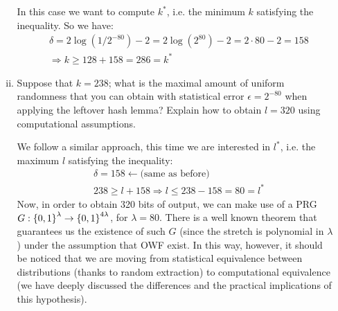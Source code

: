 \begin{enumerate}[(a)]
\begin{enumerate}[(i)]
\begin{solution}
			In this case we want to compute $k^*$, i.e. the minimum $k$ satisfying the inequality. So we have:
			\begin{align*}
				&\delta = 2 \log(1/2^{-80}) - 2 = 2 \log(2^{80}) - 2 = 2\cdot 80 - 2 = 158 \\
				&\Rightarrow k \ge 128 + 158 = 286 = k^*
			\end{align*}
		\end{solution}
		
		\item Suppose that $k = 238$; what is the maximal amount of uniform randomness that you can obtain with statistical error $\epsilon = 2^{-80}$ when applying the leftover hash lemma? Explain how to obtain $l = 320$ using computational assumptions.

		\begin{solution}
			We follow a similar approach, this time we are interested in $l^*$, i.e. the maximum $l$ satisfying the inequality:
			\begin{align*}
				&\delta = 158 \leftarrow \mbox{(same as before)} \\
				&238 \ge l + 158 \Rightarrow l \le 238 - 158 = 80 = l^*
			\end{align*}			
			Now, in order to obtain 320 bits of output, we can make use of a PRG $G: {\{0, 1\}}^{\lambda} \to {\{0, 1\}}^{4\lambda}$, for $\lambda = 80$.
			There is a well known theorem that guarantees us the existence of such $G$ (since the stretch is polynomial in $\lambda$) under the assumption that OWF exist. In this way, however, it should be noticed that we are moving from statistical equivalence between distributions (thanks to random extraction) to computational equivalence (we have deeply discussed the differences and the practical implications of this hypothesis).
		\end{solution}
	\end{enumerate}
\end{enumerate}